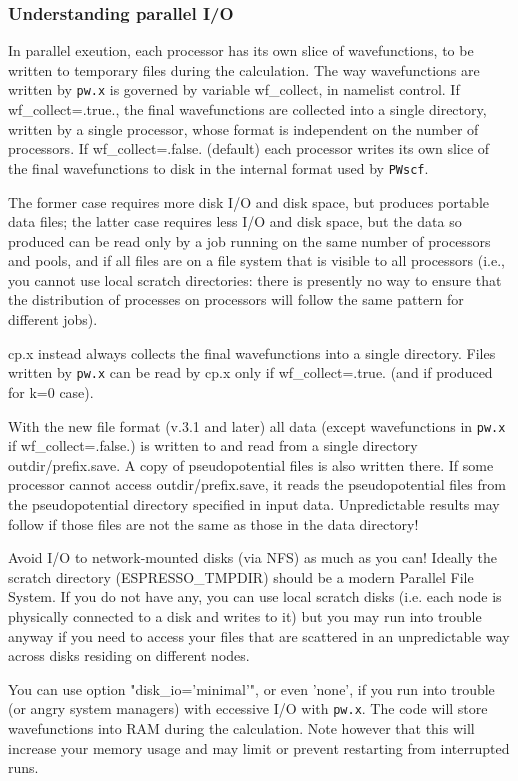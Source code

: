 \documentclass[12pt,a4paper]{article}
\def\pw.x{\texttt{pw.x}}
\def\PWscf{\texttt{PWscf}}
\begin{document}
\subsubsection{Understanding parallel I/O}
In parallel exeution, each processor has its own slice of wavefunctions, 
to be written to temporary files during the calculation. The way wavefunctions 
are written by \pw.x is governed by variable wf\_collect, in namelist control. 
If wf\_collect=.true., the final wavefunctions are collected into a single 
directory, written by a single processor, whose format is independent on 
the number of processors. If wf\_collect=.false. (default) each processor
writes its own slice of the final 
wavefunctions to disk in the internal format used by \PWscf. 

The former case requires more
disk I/O and disk space, but produces portable data files; the latter case
requires less I/O and disk space, but the data so produced can be read only
by a job running on the same number of processors and pools, and if
all files are on a file system that is visible to all processors
(i.e., you cannot use local scratch directories: there is presently no
way to ensure that the distribution of processes on processors will
follow the same pattern for different jobs).

cp.x instead always collects the final wavefunctions into a single directory.
Files written by \pw.x can be read by cp.x only if wf\_collect=.true. (and if
produced for k=0 case). 

With the new file format (v.3.1 and later) all data (except 
wavefunctions in \pw.x if wf\_collect=.false.) is written to and read from
a single directory outdir/prefix.save. A copy of pseudopotential files
is also written there. If some processor cannot access outdir/prefix.save,
it reads the pseudopotential files from the pseudopotential directory
specified in input data. Unpredictable results may follow if those files
are not the same as those in the data directory!

Avoid I/O to network-mounted disks (via NFS) as much as you can! 
Ideally the scratch directory (ESPRESSO\_TMPDIR) should be a modern 
Parallel File System. If you do not have any, you can use local
scratch disks (i.e. each node is physically connected to a disk
and writes to it) but you may run into trouble anyway if you 
need to access your files that are scattered in an unpredictable
way across disks residing on different nodes.

You can use option "disk\_io='minimal'", or even 'none', if you run
into trouble (or angry system managers) with eccessive I/O with \pw.x. 
The code will store wavefunctions into RAM during the calculation.
Note however that this will increase your memory usage and may limit 
or prevent restarting from interrupted runs.
\end{document}

